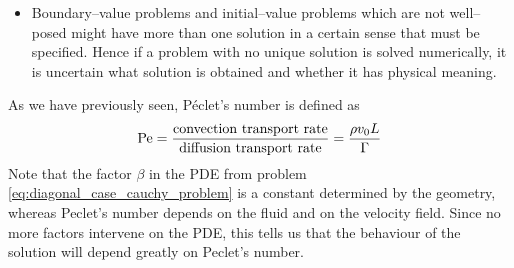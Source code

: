 \begin{itemize}
	\item Boundary--value problems and initial--value problems which are not
	well--posed might have more than one solution in a certain sense that must
	be specified. Hence if a problem with no unique solution is solved
	numerically, it is uncertain what solution is obtained and whether it has
	physical meaning.
\end{itemize}

As we have previously seen, Péclet's number is defined as
\begin{equation*}
	\mathrm{Pe} = 
	\frac{\text{convection transport rate}}{\text{diffusion transport rate}} = 
	\frac{\rho v_0 L}{\Gamma}
\end{equation*}
Note that the factor $\beta$ in the PDE from problem
\eqref{eq:diagonal_case_cauchy_problem} is a constant determined by the
geometry, whereas Peclet's number depends on the fluid and on the velocity
field. Since no more factors intervene on the PDE, this tells us that the
behaviour of the solution will depend greatly on Peclet's number. 


% 



